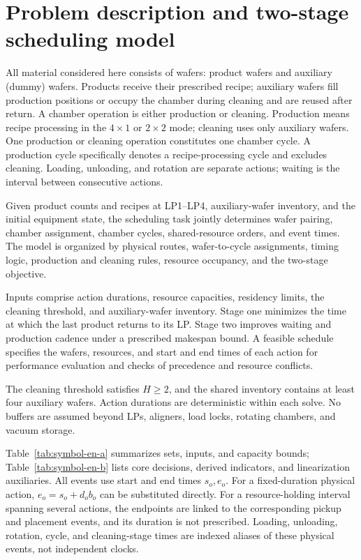 \section{Problem description and two-stage scheduling model}
\setcounter{equation}{0}

All material considered here consists of wafers: product wafers and auxiliary (dummy) wafers. Products receive their prescribed recipe; auxiliary wafers fill production positions or occupy the chamber during cleaning and are reused after return. A chamber operation is either production or cleaning. Production means recipe processing in the $4\times1$ or $2\times2$ mode; cleaning uses only auxiliary wafers. One production or cleaning operation constitutes one chamber cycle. A production cycle specifically denotes a recipe-processing cycle and excludes cleaning. Loading, unloading, and rotation are separate actions; waiting is the interval between consecutive actions.

Given product counts and recipes at LP1--LP4, auxiliary-wafer inventory, and the initial equipment state, the scheduling task jointly determines wafer pairing, chamber assignment, chamber cycles, shared-resource orders, and event times. The model is organized by physical routes, wafer-to-cycle assignments, timing logic, production and cleaning rules, resource occupancy, and the two-stage objective.

Inputs comprise action durations, resource capacities, residency limits, the cleaning threshold, and auxiliary-wafer inventory. Stage one minimizes the time at which the last product returns to its LP. Stage two improves waiting and production cadence under a prescribed makespan bound. A feasible schedule specifies the wafers, resources, and start and end times of each action for performance evaluation and checks of precedence and resource conflicts.

The cleaning threshold satisfies $H\ge2$, and the shared inventory contains at least four auxiliary wafers. Action durations are deterministic within each solve. No buffers are assumed beyond LPs, aligners, load locks, rotating chambers, and vacuum storage.

Table~\ref{tab:symbol-en-a} summarizes sets, inputs, and capacity bounds; Table~\ref{tab:symbol-en-b} lists core decisions, derived indicators, and linearization auxiliaries. All events use start and end times $s_o,e_o$. For a fixed-duration physical action, $e_o=s_o+d_ob_o$ can be substituted directly. For a resource-holding interval spanning several actions, the endpoints are linked to the corresponding pickup and placement events, and its duration is not prescribed. Loading, unloading, rotation, cycle, and cleaning-stage times are indexed aliases of these physical events, not independent clocks.

